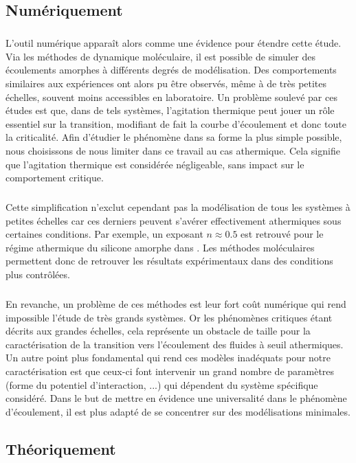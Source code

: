 \subsection{Numériquement}

\subparagraph{}L'outil numérique apparaît alors comme une évidence pour étendre cette étude. Via les méthodes de dynamique moléculaire, il est possible de simuler des écoulements amorphes à différents degrés de modélisation. Des comportements similaires aux expériences ont  alors pu être observés, même à de très petites échelles, souvent moins accessibles en laboratoire. Un problème soulevé par ces études est que, dans de tels systèmes, l'agitation thermique peut jouer un rôle essentiel sur la transition, modifiant de fait la courbe d'écoulement \cite{delbecq_rheological_2023} et donc toute la criticalité. Afin d'étudier le phénomène dans sa forme la plus simple possible, nous choisissons de nous limiter dans ce travail au cas athermique. Cela signifie que l'agitation thermique est considérée négligeable, sans impact sur le comportement critique. 

\subparagraph{}Cette simplification n'exclut cependant pas la modélisation de tous les systèmes à petites échelles car ces derniers peuvent s'avérer effectivement athermiques sous certaines conditions. Par exemple, un exposant $n\approx 0.5$ est retrouvé pour le régime athermique du silicone amorphe dans \cite{fusco_rheological_2014}. Les méthodes moléculaires permettent donc de retrouver les résultats expérimentaux dans des conditions plus contrôlées. 

\subparagraph{}En revanche, un problème de ces méthodes est leur fort coût numérique qui rend impossible l'étude de très grands systèmes. Or les phénomènes critiques étant décrits aux grandes échelles, cela représente un obstacle de taille pour la caractérisation de la transition vers l'écoulement des fluides à seuil athermiques. Un autre point plus fondamental qui rend ces modèles inadéquats pour notre caractérisation est que ceux-ci font intervenir un grand nombre de paramètres (forme du potentiel d'interaction, ...) qui dépendent du système spécifique considéré. Dans le but de mettre en évidence une universalité dans le phénomène d'écoulement, il est plus adapté de se concentrer sur des modélisations minimales.


\subsection{Théoriquement}

